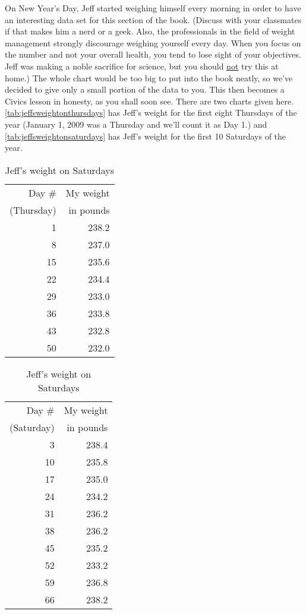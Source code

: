 \begin{exenum}
\item On New Year's Day, Jeff started weighing himself every morning in order to have an interesting data set for this section of the book.  (Discuss with your classmates if that makes him a nerd or a geek.  Also, the professionals in the field of weight management strongly discourage weighing yourself every day.  When you focus on the number and not your overall health, you tend to lose sight of your objectives. Jeff was making a noble sacrifice for science, but you should \underline{not} try this at home.)  The whole chart would be too big to put into the book neatly, so we've decided to give only a small portion of the data to you.  This then becomes a Civics lesson in honesty, as you shall soon see.  There are two charts given here.  \autoref{tab:jeffsweightonthursdays} has Jeff's weight for the first eight Thursdays of the year (January 1, 2009 was a Thursday and we'll count it as Day 1.) and \autoref{tab:jeffsweightonsaturdays} has Jeff's weight for the first 10 Saturdays of the year.  

\begin{table}

\begin{minipage}{0.45\textwidth}
\begin{tabular}{|r|r|} \hline
Day \# & My weight\\
(Thursday) & in pounds\\
\hline
1 & 238.2\\
\hline
8 & 237.0\\
\hline
15 & 235.6\\
\hline
22 & 234.4\\
\hline
29 & 233.0\\
\hline
36 & 233.8\\
\hline
43 & 232.8\\
\hline
50 & 232.0\\ 
\hline 
\end{tabular}
\caption{Jeff's weight on Thursdays}
\label{tab:jeffsweightonthursdays}
\end{minipage} \hfill
\begin{minipage}{0.45\textwidth}
\begin{tabular}{|r|r|} \hline
Day \# & My weight \\
(Saturday) & in pounds \\
\hline
3 & 238.4 \\
\hline 
10 & 235.8 \\ 
\hline 
17 & 235.0\\
\hline 
24 & 234.2\\
\hline 
31 & 236.2\\
\hline 
38 & 236.2\\
\hline 
45 & 235.2\\
\hline 
52 & 233.2\\
\hline 
59 & 236.8\\
\hline 
66 & 238.2\\ 
\hline 
\end{tabular}
\caption{Jeff's weight on Saturdays}
\label{tab:jeffsweightonsaturdays}
\end{minipage}
\end{table}


\end{exenum}
